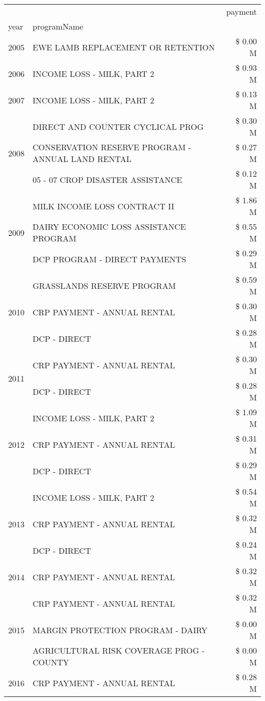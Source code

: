 \begin{tabular}{llr}
\toprule
 &  & payment \\
year & programName &  \\
\midrule
2005 & EWE LAMB REPLACEMENT OR RETENTION & \$ 0.00 M \\
\cline{1-3}
2006 & INCOME LOSS - MILK, PART 2 & \$ 0.93 M \\
\cline{1-3}
2007 & INCOME LOSS - MILK, PART 2 & \$ 0.13 M \\
\cline{1-3}
\multirow[t]{3}{*}{2008} & DIRECT AND COUNTER CYCLICAL PROG & \$ 0.30 M \\
 & CONSERVATION RESERVE PROGRAM - ANNUAL LAND RENTAL & \$ 0.27 M \\
 & 05 - 07 CROP DISASTER ASSISTANCE & \$ 0.12 M \\
\cline{1-3}
\multirow[t]{3}{*}{2009} & MILK INCOME LOSS CONTRACT II & \$ 1.86 M \\
 & DAIRY ECONOMIC LOSS ASSISTANCE PROGRAM & \$ 0.55 M \\
 & DCP PROGRAM - DIRECT PAYMENTS & \$ 0.29 M \\
\cline{1-3}
\multirow[t]{3}{*}{2010} & GRASSLANDS RESERVE PROGRAM & \$ 0.59 M \\
 & CRP PAYMENT - ANNUAL RENTAL & \$ 0.30 M \\
 & DCP - DIRECT & \$ 0.28 M \\
\cline{1-3}
\multirow[t]{2}{*}{2011} & CRP PAYMENT - ANNUAL RENTAL & \$ 0.30 M \\
 & DCP - DIRECT & \$ 0.28 M \\
\cline{1-3}
\multirow[t]{3}{*}{2012} & INCOME LOSS - MILK, PART 2 & \$ 1.09 M \\
 & CRP PAYMENT - ANNUAL RENTAL & \$ 0.31 M \\
 & DCP - DIRECT & \$ 0.29 M \\
\cline{1-3}
\multirow[t]{3}{*}{2013} & INCOME LOSS - MILK, PART 2 & \$ 0.54 M \\
 & CRP PAYMENT - ANNUAL RENTAL & \$ 0.32 M \\
 & DCP - DIRECT & \$ 0.24 M \\
\cline{1-3}
2014 & CRP PAYMENT - ANNUAL RENTAL & \$ 0.32 M \\
\cline{1-3}
\multirow[t]{3}{*}{2015} & CRP PAYMENT - ANNUAL RENTAL & \$ 0.32 M \\
 & MARGIN PROTECTION PROGRAM - DAIRY & \$ 0.00 M \\
 & AGRICULTURAL RISK COVERAGE PROG - COUNTY & \$ 0.00 M \\
\cline{1-3}
\multirow[t]{3}{*}{2016} & CRP PAYMENT - ANNUAL RENTAL & \$ 0.28 M \\

\end{tabular}
